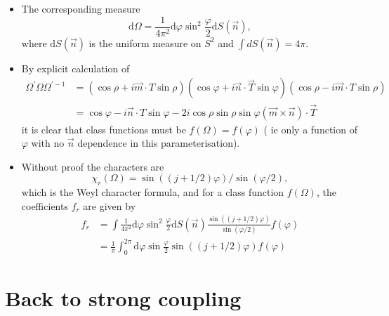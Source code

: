 \begin{itemize}
\begin{itemize}
    \item The corresponding measure
\begin{equation}
\text{d} \Omega=\frac{1}{4 \pi^{2}} \text{d} \varphi \sin ^{2} \frac{\varphi}{2} \text{d}S(\vec{n}),
\end{equation}
where $\text{d}S(\vec{n})$ is the uniform measure on $S^2$ and $\int d S(\vec{n})=4 \pi$.

  \item By explicit calculation of
\begin{equation}
\begin{aligned}
\Omega^{\prime} \Omega \Omega^{\prime-1} & =(\cos \rho+i \vec{m} \cdot T \sin \rho)(\cos \varphi+i \vec{n} \cdot \vec{T} \sin \varphi)(\cos \rho-i \vec{m} \cdot T \sin \rho) \\
& =\cos \varphi-i \vec{n} \cdot T \sin \varphi-2 i \cos \rho \sin \rho \sin \varphi(\vec{m} \times \vec{n}) \cdot \vec{T}
\end{aligned}
\end{equation}
it is clear that class functions must be \(f(\Omega)=f(\varphi)\) ( ie only a function of $\varphi$ with no \(\vec{n}\) dependence in this parameterisation).

  \item Without proof the characters are 
\begin{equation}
    \chi_r(\Omega) = \sin((j + 1/2) \varphi) / \sin(\varphi/2),
\end{equation}
which is the Weyl character formula, and for a class function $f(\Omega)$, the coefficients $f_r$ are given by
\begin{align}
    f_r &= \int \frac{1}{4\pi^2}\text{d}\varphi \sin^2\frac{\varphi}{2}\text{d}S(\vec{n}) \frac{\sin((j+1/2)\varphi)}{\sin(\varphi/2)}f(\varphi) \nonumber \\
    &= \frac{1}{\pi} \int_{0}^{2 \pi} \text{d} \varphi \sin \frac{\varphi}{2}\sin((j+1/2)\varphi)f(\varphi)
\end{align}
\end{itemize}

\end{itemize}


\section{Back to strong coupling}

